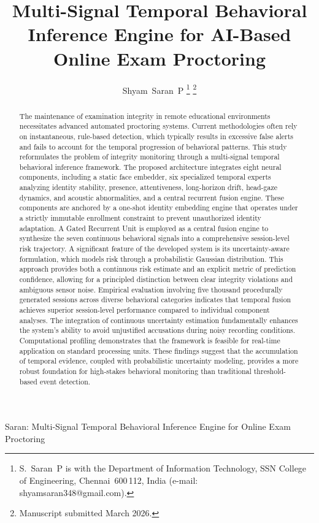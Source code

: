 \documentclass[journal]{IEEEtran}
\begin{document}
\title{Multi-Signal Temporal Behavioral Inference Engine for AI-Based Online Exam Proctoring}

\author{Shyam~Saran~P%
\thanks{S.~Saran~P is with the Department of Information Technology, SSN College of Engineering, Chennai~600\,112, India (e-mail: shyamsaran348@gmail.com).}%
\thanks{Manuscript submitted March 2026.}}

%
{Saran: Multi-Signal Temporal Behavioral Inference Engine for Online Exam Proctoring}

\maketitle

\begin{abstract}
The maintenance of examination integrity in remote educational environments necessitates advanced automated proctoring systems. Current methodologies often rely on instantaneous, rule-based detection, which typically results in excessive false alerts and fails to account for the temporal progression of behavioral patterns. This study reformulates the problem of integrity monitoring through a multi-signal temporal behavioral inference framework. The proposed architecture integrates eight neural components, including a static face embedder, six specialized temporal experts analyzing identity stability, presence, attentiveness, long-horizon drift, head-gaze dynamics, and acoustic abnormalities, and a central recurrent fusion engine. These components are anchored by a one-shot identity embedding engine that operates under a strictly immutable enrollment constraint to prevent unauthorized identity adaptation. A Gated Recurrent Unit is employed as a central fusion engine to synthesize the seven continuous behavioral signals into a comprehensive session-level risk trajectory. A significant feature of the developed system is its uncertainty-aware formulation, which models risk through a probabilistic Gaussian distribution. This approach provides both a continuous risk estimate and an explicit metric of prediction confidence, allowing for a principled distinction between clear integrity violations and ambiguous sensor noise. Empirical evaluation involving five thousand procedurally generated sessions across diverse behavioral categories indicates that temporal fusion achieves superior session-level performance compared to individual component analyses. The integration of continuous uncertainty estimation fundamentally enhances the system’s ability to avoid unjustified accusations during noisy recording conditions. Computational profiling demonstrates that the framework is feasible for real-time application on standard processing units. These findings suggest that the accumulation of temporal evidence, coupled with probabilistic uncertainty modeling, provides a more robust foundation for high-stakes behavioral monitoring than traditional threshold-based event detection.
\end{abstract}
\end{document}
